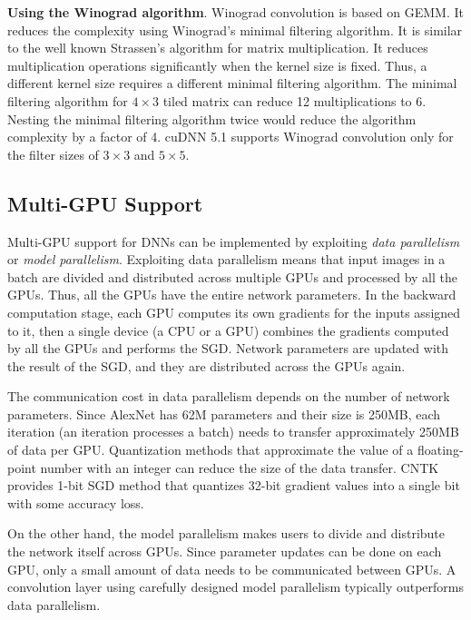 {\bf Using the Winograd algorithm}. Winograd convolution is based on GEMM\cite{cublas}. It reduces the complexity using Winograd's minimal filtering algorithm\cite{winograd}. It is similar to the well known Strassen's algorithm\cite{winograd1980arithmetic} for matrix multiplication. It reduces multiplication operations significantly when the kernel size is fixed. Thus, a different kernel size requires a different minimal filtering algorithm. The minimal filtering algorithm for $4 \times 3$ tiled matrix can reduce 12 multiplications to 6. Nesting the minimal filtering algorithm twice would reduce the algorithm complexity by a factor of 4\cite{winograd}. cuDNN 5.1 supports Winograd convolution only for the filter sizes of $3 \times 3$ and $5 \times 5$.

\subsection{Multi-GPU Support}
\label{sec:multiGPU-parallelism}
Multi-GPU support for DNNs can be implemented by exploiting \textit{data parallelism} or \textit{model parallelism}\cite{NIPS2012_4687}. Exploiting data parallelism means that input images in a batch are divided and distributed across multiple GPUs and processed by all the GPUs. Thus, all the GPUs have the entire network parameters. In the backward computation stage, each GPU computes its own gradients for the inputs assigned to it, then a single device (a CPU or a GPU) combines the gradients computed by all the GPUs and performs the SGD. Network parameters are updated with the result of the SGD, and they are distributed across the GPUs again. 

The communication cost in data parallelism depends on the number of network parameters. Since AlexNet has 62M parameters and their size is 250MB, each iteration (an iteration processes a batch) needs to transfer approximately 250MB of data per GPU. Quantization methods that approximate the value of a floating-point number with an integer can reduce the size of the data transfer\cite{deepcompress}. CNTK provides 1-bit SGD method that quantizes 32-bit gradient values into a single bit with some accuracy loss\cite{1-bit-stochastic-gradient-descent-and-application-to-data-parallel-distributed-training-of-speech-dnns}.

On the other hand, the model parallelism makes users to divide and distribute the network itself across GPUs. Since parameter updates can be done on each GPU, only a small amount of data needs to be communicated between GPUs. A convolution layer using carefully designed model parallelism typically outperforms data parallelism\cite{DBLP:journals/corr/YadanATR13}.

